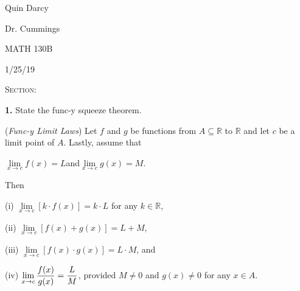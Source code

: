 \documentclass[12pt, a4paper]{article}
\begin{document}
  
\begin{flushleft}
  
    Quin Darcy\par
    Dr. Cummings\par
    MATH 130B\par
    1/25/19
  
\end{flushleft}
  
\centerline{}
 
\vspace{4mm}
 
\noindent\textsc{Section: }\par
 
\justifying
 
\vspace{1mm}
 
\hline
 
\vspace{6mm}

\noindent\textbf{1. } State the func-y squeeze theorem.

\begin{description}
    \item(\textit{Func-y Limit Laws}) Let $f$ and $g$ be functions from $A\subseteq\mathbb{R}$ to $\mathbb{R}$ and let $c$ be a limit point of $A$. Lastly, assume that 
    
    \vspace{3mm}
    
    \centerline{$\lim\limits_{x\rightarrow c}f(x)=L$\hspace{4mm}and\hspace{4mm}$\lim\limits_{x\rightarrow c}g(x)=M$.}
    
    \vspace{3mm}
    
    \item Then
    
    \begin{description}
        \item(i) $\lim\limits_{x\rightarrow c}[k\cdot f(x)]=k\cdot L$ for any $k\in\mathbb{R}$,
        \item(ii) $\lim\limits_{x\rightarrow c}[f(x)+g(x)]=L+M$,
        \item(iii) $\lim\limits_{x\rightarrow c}[f(x)\cdot g(x)]=L\cdot M$, and
        \item(iv) $\lim\limits_{x\rightarrow c}\mathlarger{\frac{f(x)}{g(x)}}=\mathlarger{\frac{L}{M}}$, provided $M\neq 0$ and $g(x)\neq 0$ for any $x\in A$.
    \end{description}
\end{description}
\end{document}
